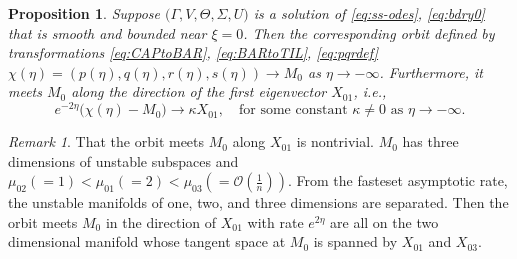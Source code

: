 \documentclass[a4paper,11pt]{article}
\def\BO{{\mathcal{O}}}
\newtheorem{proposition}{Proposition}[section]
\theoremstyle{remark}
\newtheorem{remark}{Remark}[section]
\begin{document}
\begin{proposition} \label{prop1}
    Suppose $\big(\Gamma,V,\Theta,\Sigma,U\big)$ is a solution of \eqref{eq:ss-odes}, \eqref{eq:bdry0} that is smooth and bounded near $\xi=0$. Then the corresponding orbit defined by transformations \eqref{eq:CAPtoBAR}, \eqref{eq:BARtoTIL}, \eqref{eq:pqrdef} $\chi(\eta) = (p(\eta), q(\eta), r(\eta),s(\eta)) \rightarrow M_0$ as $\eta \rightarrow -\infty$. Furthermore, it meets $M_0$ along the direction of the first eigenvector $X_{01}$, i.e.,
    \begin{equation} \label{eq:alpha}
     e^{-2\eta}\big(\chi(\eta) - M_0 \big) \rightarrow \kappa X_{01}, \quad \text{for some constant $\kappa\ne0$ as $\eta \rightarrow -\infty$.}
    \end{equation}
\end{proposition}
\begin{remark} \label{rem:alpha}
  That the orbit meets $M_0$ along $X_{01}$ is nontrivial. $M_0$ has three dimensions of unstable subspaces and $\mu_{02}(=1)<\mu_{01}(=2)<\mu_{03}(=\BO(\frac{1}{n}))$. From the fasteset asymptotic rate, the unstable manifolds of one, two, and three dimensions are separated. Then the orbit meets $M_0$ in the direction of $X_{01}$ with rate $e^{2\eta}$ are all on the two dimensional manifold whose tangent space at $M_0$ is spanned by $X_{01}$ and $X_{03}$.
%
%
%

%
%
%
\end{remark}
\end{document}

